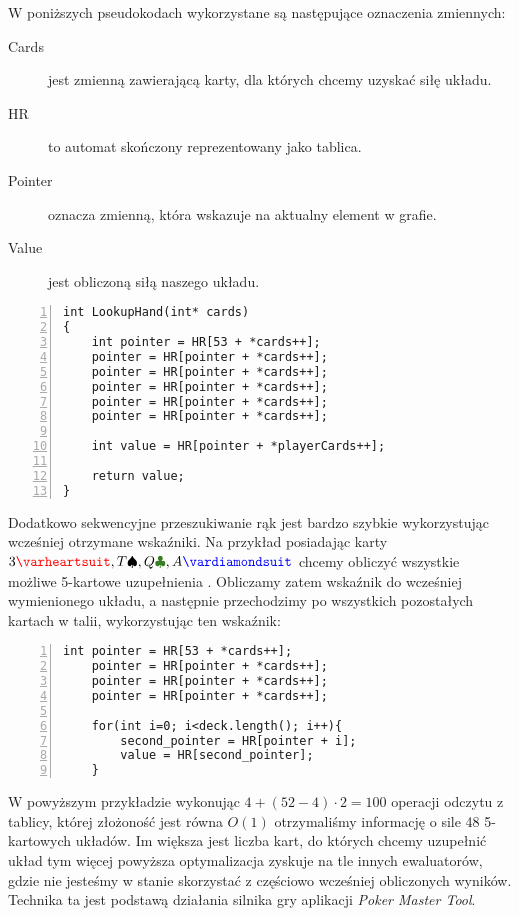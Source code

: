 W poniższych pseudokodach wykorzystane są następujące oznaczenia zmiennych:

\begin{description}
  \item[Cards] jest zmienną zawierającą karty, dla których chcemy uzyskać siłę układu.
  \item[HR] to automat skończony reprezentowany jako tablica.
  \item[Pointer] oznacza zmienną, która wskazuje na aktualny element w grafie.
  \item[Value] jest obliczoną siłą naszego układu.
\end{description}

\begin{Verbatim}[numbers=left,xleftmargin=5mm, frame=single]
int LookupHand(int* cards)
{
    int pointer = HR[53 + *cards++];
    pointer = HR[pointer + *cards++];
    pointer = HR[pointer + *cards++];
    pointer = HR[pointer + *cards++];
    pointer = HR[pointer + *cards++];
    pointer = HR[pointer + *cards++];
    
    int value = HR[pointer + *playerCards++];
    
    return value;
}
\end{Verbatim}

Dodatkowo sekwencyjne przeszukiwanie rąk jest bardzo szybkie wykorzystując wcześniej otrzymane wskaźniki. Na przykład posiadając karty $3\hearts, T\spades, Q\clubs, A\diamonds$ chcemy obliczyć wszystkie możliwe 5-kartowe uzupełnienia . Obliczamy zatem wskaźnik do wcześniej wymienionego układu, a następnie przechodzimy po wszystkich pozostałych kartach w talii, wykorzystując ten wskaźnik:

\begin{Verbatim}[numbers=left,xleftmargin=5mm, frame=single]
    int pointer = HR[53 + *cards++];
    pointer = HR[pointer + *cards++];
    pointer = HR[pointer + *cards++];
    pointer = HR[pointer + *cards++];

    for(int i=0; i<deck.length(); i++){
        second_pointer = HR[pointer + i];
        value = HR[second_pointer];
    }
\end{Verbatim}

W powyższym przykładzie wykonując $4 + (52-4) \cdot 2 = 100$ operacji odczytu z tablicy, której złożoność jest równa $O(1)$ otrzymaliśmy informację o sile 48 5-kartowych układów. Im większa jest liczba kart, do których chcemy uzupełnić układ tym więcej powyższa optymalizacja zyskuje na tle innych ewaluatorów, gdzie nie jesteśmy w stanie skorzystać z częściowo wcześniej obliczonych wyników. Technika ta jest podstawą działania silnika gry aplikacji \emph{Poker Master Tool}. 